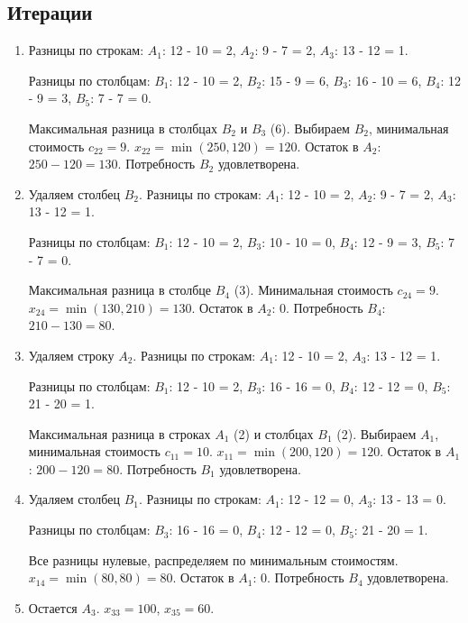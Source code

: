\documentclass{article}
\begin{document}
\subsection{Итерации}
\begin{enumerate}
\item Разницы по строкам:  
\( A_1 \): 12 - 10 = 2,  
\( A_2 \): 9 - 7 = 2,  
\( A_3 \): 13 - 12 = 1.  

Разницы по столбцам:  
\( B_1 \): 12 - 10 = 2,  
\( B_2 \): 15 - 9 = 6,  
\( B_3 \): 16 - 10 = 6,  
\( B_4 \): 12 - 9 = 3,  
\( B_5 \): 7 - 7 = 0.  

Максимальная разница в столбцах \( B_2 \) и \( B_3 \) (6). Выбираем \( B_2 \), минимальная стоимость \( c_{22} = 9 \).  
\( x_{22} = \min(250, 120) = 120 \).  
Остаток в \( A_2 \): \( 250 - 120 = 130 \).  
Потребность \( B_2 \) удовлетворена.

\item Удаляем столбец \( B_2 \).  
Разницы по строкам:  
\( A_1 \): 12 - 10 = 2,  
\( A_2 \): 9 - 7 = 2,  
\( A_3 \): 13 - 12 = 1.  

Разницы по столбцам:  
\( B_1 \): 12 - 10 = 2,  
\( B_3 \): 10 - 10 = 0,  
\( B_4 \): 12 - 9 = 3,  
\( B_5 \): 7 - 7 = 0.  

Максимальная разница в столбце \( B_4 \) (3). Минимальная стоимость \( c_{24} = 9 \).  
\( x_{24} = \min(130, 210) = 130 \).  
Остаток в \( A_2 \): 0.  
Потребность \( B_4 \): \( 210 - 130 = 80 \).

\item Удаляем строку \( A_2 \).  
Разницы по строкам:  
\( A_1 \): 12 - 10 = 2,  
\( A_3 \): 13 - 12 = 1.  

Разницы по столбцам:  
\( B_1 \): 12 - 10 = 2,  
\( B_3 \): 16 - 16 = 0,  
\( B_4 \): 12 - 12 = 0,  
\( B_5 \): 21 - 20 = 1.  

Максимальная разница в строках \( A_1 \) (2) и столбцах \( B_1 \) (2). Выбираем \( A_1 \), минимальная стоимость \( c_{11} = 10 \).  
\( x_{11} = \min(200, 120) = 120 \).  
Остаток в \( A_1 \): \( 200 - 120 = 80 \).  
Потребность \( B_1 \) удовлетворена.

\item Удаляем столбец \( B_1 \).  
Разницы по строкам:  
\( A_1 \): 12 - 12 = 0,  
\( A_3 \): 13 - 13 = 0.  

Разницы по столбцам:  
\( B_3 \): 16 - 16 = 0,  
\( B_4 \): 12 - 12 = 0,  
\( B_5 \): 21 - 20 = 1.  

Все разницы нулевые, распределяем по минимальным стоимостям.  
\( x_{14} = \min(80, 80) = 80 \).  
Остаток в \( A_1 \): 0.  
Потребность \( B_4 \) удовлетворена.

\item Остается \( A_3 \).  
\( x_{33} = 100 \), \( x_{35} = 60 \).
\end{enumerate}
\end{document}
